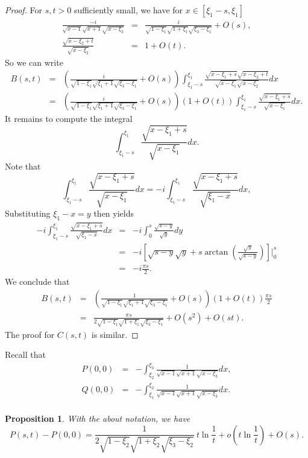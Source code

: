 \documentclass[11pt]{amsart}
\theoremstyle{plain}
\newtheorem{Proposition}[Theorem]{Proposition}
\begin{document}
\begin{proof}
For $s,t>0$ sufficiently small, we have  for  $x\in[\xi_1-s,\xi_1]$
\begin{eqnarray*}
 \frac{-i}{\sqrt{x-1}\sqrt{x+1}\sqrt{x-\xi_3}} &=& \frac{i}{\sqrt{1-\xi_1}\sqrt{1+\xi_1}\sqrt{\xi_3-\xi_1}}+ O(s), \\
 \frac{\sqrt{x-\xi_2+t}}{\sqrt{x-\xi_2}} &=& 1+ O(t).
\end{eqnarray*}
 So we can write
\begin{eqnarray*}
  B(s,t) &=& \left(\frac{i}{\sqrt{1-\xi_1}\sqrt{\xi_1+1}\sqrt{\xi_3-\xi_1}}+O(s) \right)\int_{\xi_1-s}^{\xi_1}\frac{\sqrt{x-\xi_1+s}\sqrt{x-\xi_2+t}}{\sqrt{x-\xi_1}\sqrt{x-\xi_2}}dx \\
  &=& \left(\frac{i}{\sqrt{1-\xi_1}\sqrt{\xi_1+1}\sqrt{\xi_3-\xi_1}}+O(s) \right)\left(1+O(t)\right)
  \int_{\xi_1-s}^{\xi_1}\frac{\sqrt{x-\xi_1+s}}{\sqrt{x-\xi_1}}dx.
\end{eqnarray*}
It remains to compute the integral 
$$\int_{\xi_1-s}^{\xi_1}\frac{\sqrt{x-\xi_1+s}}{\sqrt{x-\xi_1}}dx.$$ Note that 
$$\int_{\xi_1-s}^{\xi_1}\frac{\sqrt{x-\xi_1+s}}{\sqrt{x-\xi_1}}dx=-i\int_{\xi_1-s}^{\xi_1}\frac{\sqrt{x-\xi_1+s}}{\sqrt{\xi_1-x}}dx,$$
Substituting $\xi_1-x=y$ then yields 
\begin{eqnarray*}
 -i\int_{\xi_1-s}^{\xi_1}\frac{\sqrt{x-\xi_1+s}}{\sqrt{\xi_1-x}}dx&=&-i\int_0^s\frac{\sqrt{s-y}}{\sqrt{y}}dy\\&=&-i\left[ \sqrt{s-y}\sqrt{y}+s\arctan\left( \frac{\sqrt{y}}{\sqrt{s-y}}\right)\right]\bigg|_0^s
 \\&=& -i\frac{\pi s}{2} . 
\end{eqnarray*}
We conclude that 
\begin{eqnarray*}
  B(s,t) &=& \left(\frac{1}{\sqrt{1-\xi_1}\sqrt{\xi_1+1}\sqrt{\xi_3-\xi_1}}+O(s) \right)\left(1+O(t)\right) \frac{\pi s}{2} \\
  &=& \frac{\pi s}{2\sqrt{1-\xi_1}\sqrt{1+\xi_1}\sqrt{\xi_3-\xi_1}}+ O(s^2) + O(st).
\end{eqnarray*}
The proof for $C(s,t)$ is similar.
\end{proof}

Recall that 
\begin{eqnarray*}
  P(0,0) &=& - \int_{\xi_2}^{\xi_3}\frac{1}{\sqrt{x-1}\sqrt{x+1}\sqrt{x-\xi_3}} dx,  \\
  Q(0,0) &=& - \int_{\xi_1}^{\xi_2}\frac{1}{\sqrt{x-1}\sqrt{x+1}\sqrt{x-\xi_3}} dx.  \\
\end{eqnarray*}
\begin{Proposition}\label{prop:P}
With the about notation, we have 
    $$P(s,t)-P(0,0)=\frac{1}{2\sqrt{1-\xi_2}\sqrt{1+\xi_2}\sqrt{\xi_3-\xi_2}} \  t\ln \frac{1}{t}+
    o\left( t \ln \frac{1}{t} \right) +O(s).$$
\end{Proposition}
\end{document}
